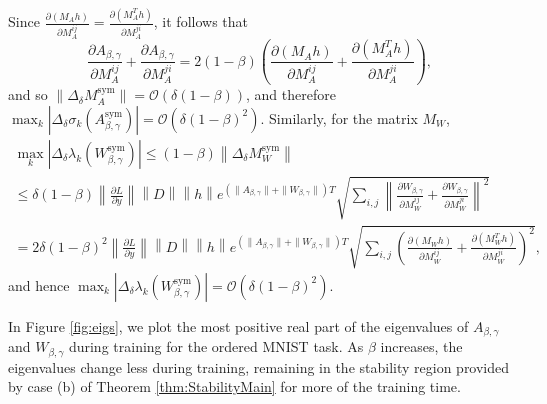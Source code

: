 \documentclass{article} \usepackage{iclr2021_conference,times}
\newcommand{\sym}{\mathrm{sym}}
\begin{document}
Since $\frac{\partial(M_{A}h)}{\partial M_{A}^{ij}}=\frac{\partial(M_{A}^{T}h)}{\partial M_{A}^{ji}}$, it follows that
\[
\frac{\partial A_{\beta,\gamma}}{\partial M_{A}^{ij}}+\frac{\partial A_{\beta,\gamma}}{\partial M_{A}^{ji}}=2(1-\beta)\left(\frac{\partial(M_{A}h)}{\partial M_{A}^{ij}}+\frac{\partial(M_{A}^{T}h)}{\partial M_{A}^{ji}}\right),
\]
and so $\|\Delta_\delta M_A^\sym\| = \mathcal{O}(\delta(1-\beta))$, and therefore $\max_k |\Delta_\delta \sigma_k(A_{\beta,\gamma}^\sym)| = \mathcal{O}(\delta(1-\beta)^2)$. Similarly, for the matrix $M_W$,
\begin{multline*}
\max_{k}\left|\Delta_{\delta}\lambda_{k}(W_{\beta,\gamma}^{\sym})\right|\leq(1-\beta)\left\lVert \Delta_{\delta}M_{W}^{\sym}\right\rVert \\
\leq\delta(1-\beta)\left\lVert \frac{\partial L}{\partial y}\right\rVert \left\lVert D\right\rVert \left\lVert h\right\rVert e^{(\| A_{\beta,\gamma}\| +\| W_{\beta,\gamma}\| )T}\sqrt{\sum_{i,j}\left\lVert \frac{\partial W_{\beta,\gamma}}{\partial M_{W}^{ij}}+\frac{\partial W_{\beta,\gamma}}{\partial M_{W}^{ji}}\right\rVert ^{2}}\\
=2\delta(1-\beta)^{2}\left\lVert \frac{\partial L}{\partial y}\right\rVert \left\lVert D\right\rVert \left\lVert h\right\rVert e^{(\| A_{\beta,\gamma}\| +\| W_{\beta,\gamma}\| )T}\sqrt{\sum_{i,j}\left(\frac{\partial(M_{W}h)}{\partial M_{W}^{ij}}+\frac{\partial(M_{W}^{T}h)}{\partial M_{W}^{ji}}\right)^{2}},
\end{multline*}
and hence $\max_k |\Delta_\delta \lambda_k(W_{\beta,\gamma}^\sym)| = \mathcal{O}(\delta(1-\beta)^2)$. \qedsymbol

In Figure \ref{fig:eigs}, we plot the most positive real part of the eigenvalues of $A_{\beta,\gamma}$ and $W_{\beta,\gamma}$ during training for the ordered MNIST task. As $\beta$ increases, the eigenvalues change less during training, remaining in the stability region provided by case (b) of Theorem \ref{thm:StabilityMain} for more of the training time.
\end{document}
